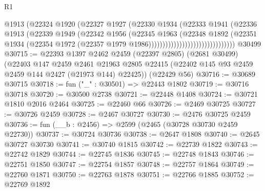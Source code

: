 \begin{lexlean}{R1}
\begin{coremodule}
                                          @1913
                                          (@22324
                                            @1920
                                            (@22327
                                              @1927
                                              (@22330
                                                @1934
                                                (@22333
                                                  @1941
                                                  (@22336
                                                    @1913
                                                    (@22339
                                                      @1949
                                                      (@22342
                                                        @1956
                                                        (@22345
                                                          @1963
                                                          (@22348
                                                            @1892
                                                            (@22351
                                                              @1934
                                                              (@22354
                                                                @1972
                                                                (@22357
                                                                  @1979
                                                                  @1986)))))))))))))))))))))))))))))))
    @30499
@30715 := @22393
    @1397
    @2462
    @2459
    (@22397 @2805)
    (@2681 @30499)
    (@22403
      @147
      @2459
      @2461
      @21963
      @2805
      @22415
      (@22402 @145 @93 @2459 @2459 @144 @2427 (@21973 @144) @22425))
    (@22429 @56)
@30716 := @30689 @30715
@30718 := fun ("_" : @30501) => @22443 @1802
@30719 := @30716 @30718
@30720 := @30500 @2738
@30721 := @22448 @1408
@30724 := @30721 @1810 @2016 @2464
@30725 := @22460 @66
@30726 := @2469 @30725
@30727 := @30726 @2459
@30728 := @2467 @30727
@30730 := @2476 @30725 @2459
@30736 := fun (__b : @2456) => @2599 (@2465 (@30728 @30730 @2459 @22730))
@30737 := @30724 @30736
@30738 := @2647 @1808
@30740 := @2645 @30727 @30730
@30741 := @30740 @1815
@30742 := @22739 @1822
@30743 := @22742 @1829
@30744 := @22745 @1836
@30745 := @22748 @1843
@30746 := @22751 @1850
@30747 := @22754 @1857
@30748 := @22757 @1864
@30749 := @22760 @1871
@30750 := @22763 @1878
@30751 := @22766 @1885
@30752 := @22769 @1892

\end{coremodule}
\end{lexlean}
